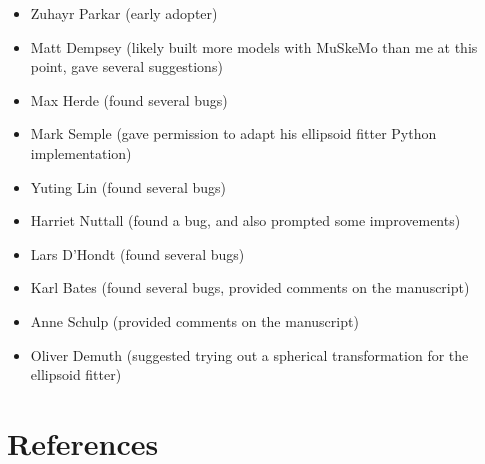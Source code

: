 \documentclass{article}
\begin{document}
\begin{itemize}
\item Zuhayr Parkar (early adopter)
\item Matt Dempsey (likely built more models with MuSkeMo than me at this point, gave several suggestions)
\item Max Herde (found several bugs)
\item Mark Semple (gave permission to adapt his ellipsoid fitter Python implementation)
\item Yuting Lin (found several bugs)
\item Harriet Nuttall (found a bug, and also prompted some improvements)
\item Lars D'Hondt (found several bugs)
\item Karl Bates (found several bugs, provided comments on the manuscript)
\item Anne Schulp (provided comments on the manuscript)
\item Oliver Demuth (suggested trying out a spherical transformation for the ellipsoid fitter)
\end{itemize}


\section*{References}
\printbibliography[heading=none] %
\end{document}
